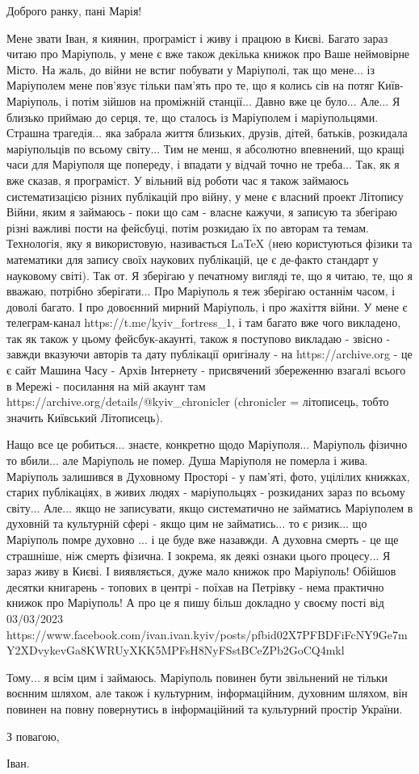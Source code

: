  
 
 
 
 

Доброго ранку, пані Марія!

Мене звати Іван, я киянин, програміст і живу і працюю в Києві. Багато зараз
читаю про Маріуполь, у мене є вже також декілька книжок про Ваше неймовірне
Місто. На жаль, до війни не встиг побувати у Маріуполі, так що мене...  із
Маріуполем мене пов'язує тільки пам'ять про те, що я колись сів на потяг
Київ-Маріуполь, і потім зійшов на проміжній станції... Давно вже це було...
Але... Я близько приймаю до серця, те, що сталось із Маріуполем і
маріупольцями. Страшна трагедія... яка забрала життя близьких, друзів, дітей,
батьків, розкидала маріупольців по всьому світу...  Тим не менш, я абсолютно
впевнений, що кращі часи для Маріуполя ще попереду, і впадати у відчай точно не
треба...  Так, як я вже сказав, я програміст. У вільний від роботи час я також
займаюсь систематизацією різних публікацій про війну, у мене є власний проект
Літопису Війни, яким я займаюсь - поки що сам - власне кажучи, я записую та
збегіраю різні важливі пости на фейсбуці, потім розкидаю їх по авторам та
темам. Технологія, яку я використовую, називається LaTeX (нею користуються
фізики та математики для запису своїх наукових публікацій, це є де-факто
стандарт у науковому світі). Так от.  Я зберігаю у печатному вигляді те, що я
читаю, те, що я вважаю, потрібно зберігати...  Про Маріуполь я теж зберігаю
останнім часом, і доволі багато. І про довоєнний мирний Маріуполь, і про
жахіття війни. У мене є телеграм-канал https://t.me/kyiv_fortress_1, і там
багато вже чого викладено, так як також у цьому фейсбук-акаунті, також я
поступово викладаю - звісно - завжди вказуючи авторів та дату публікації
оригіналу - на https://archive.org - це є сайт Машина Часу - Архів Інтернету -
присвячений збереженню взагалі всього в Мережі - посилання на мій акаунт там
https://archive.org/details/@kyiv_chronicler (chronicler = літописець, тобто
значить Київський Літописець).

Нащо все це робиться... знаєте, конкретно щодо Маріуполя... Маріуполь фізично
то вбили...  але Маріуполь не помер. Душа Маріуполя не померла і жива.
Маріуполь залишився в Духовному Просторі - у пам'яті, фото, уцілілих книжках,
старих публікаціях, в живих людях - маріупольцях - розкиданих зараз по всьому
світу...  Але... якщо не записувати, якщо систематично не займатись Маріуполем
в духовній та культурній сфері - якщо цим не займатись... то є ризик... що
Маріуполь помре духовно ...  і це буде вже назавжди. А духовна смерть - це ще
страшніше, ніж смерть фізична. І зокрема, як деякі ознаки цього процесу... Я
зараз живу в Києві. І виявляється, дуже мало книжок про Маріуполь!  Обійшов
десятки книгарень - топових в центрі - поїхав на Петрівку - нема практично
книжок про Маріуполь!  А про це я пишу більш докладно у своєму пості від
03/03/2023
https://www.facebook.com/ivan.ivan.kyiv/posts/pfbid02X7PFBDFiFcNY9Ge7mY2XDvykevGa8KWRUyXKK5MPFsH8NyFSstBCeZPb2GoCQ4mkl

Тому... я всім цим і займаюсь. Маріуполь повинен бути звільнений не тільки
воєнним шляхом, але також і культурним, інформаційним, духовним шляхом, він
повинен на повну повернутись в інформаційний та культурний простір України. 

З повагою,

Іван.
